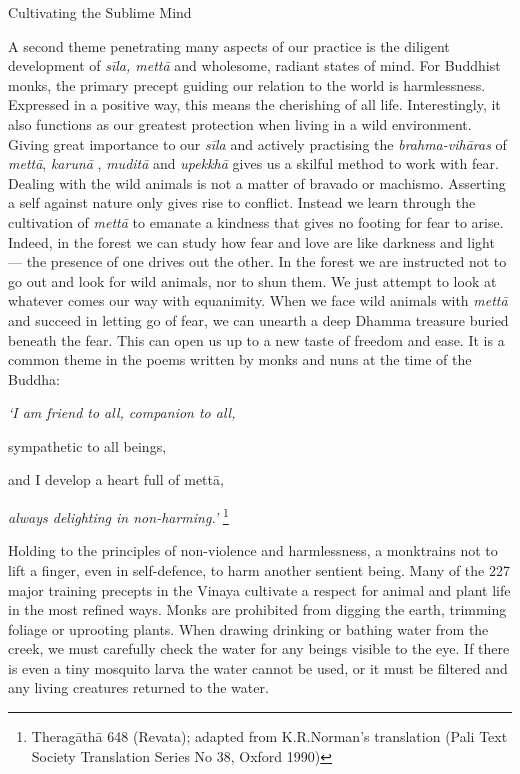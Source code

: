 Cultivating the Sublime Mind

A second theme penetrating many aspects of our practice is the diligent
development of \emph{sīla, mettā} and wholesome, radiant states of mind.
For Buddhist monks, the primary precept guiding our relation to the
world is harmlessness. Expressed in a positive way, this means the
cherishing of all life. Interestingly, it also functions as our greatest
protection when living in a wild environment. Giving great importance to
our \emph{sīla} and actively practising the \emph{brahma-vihāras} of
\emph{mettā}, \emph{karunā} , \emph{muditā} and \emph{upekkhā} gives us
a skilful method to work with fear. Dealing with the wild animals is not
a matter of bravado or machismo. Asserting a self against nature only
gives rise to conflict. Instead we learn through the cultivation of
\emph{mettā} to emanate a kindness that gives no footing for fear to
arise. Indeed, in the forest we can study how fear and love are like
darkness and light --- the presence of one drives out the other. In the
forest we are instructed not to go out and look for wild animals, nor to
shun them. We just attempt to look at whatever comes our way with
equanimity. When we face wild animals with \emph{mettā} and succeed in
letting go of fear, we can unearth a deep Dhamma treasure buried beneath
the fear. This can open us up to a new taste of freedom and ease. It is
a common theme in the poems written by monks and nuns at the time of the
Buddha:

\emph{`I am friend to all, companion to all,}

sympathetic to all beings,

and I develop a heart full of mettā,

\emph{always delighting in non-harming.'} \footnote{Theragāthā 648
  (Revata); adapted from K.R.Norman's translation (Pali Text Society
  Translation Series No 38, Oxford 1990)}

Holding to the principles of non-violence and harmlessness, a monktrains
not to lift a finger, even in self-defence, to harm another sentient
being. Many of the 227 major training precepts in the Vinaya cultivate a
respect for animal and plant life in the most refined ways. Monks are
prohibited from digging the earth, trimming foliage or uprooting plants.
When drawing drinking or bathing water from the creek, we must carefully
check the water for any beings visible to the eye. If there is even a
tiny mosquito larva the water cannot be used, or it must be filtered and
any living creatures returned to the water.

